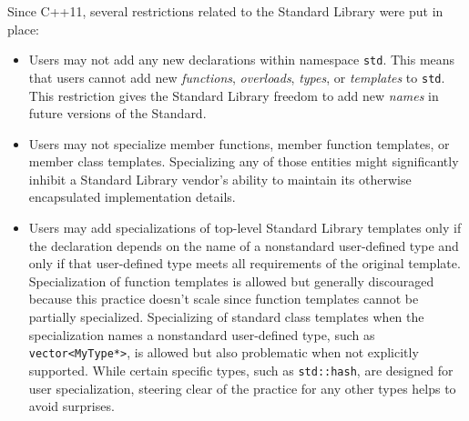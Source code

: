 Since C++11, several restrictions related to the Standard Library were
put in place:
\begin{itemize}
\item{Users may not add any new declarations within namespace \texttt{std}. This means that users cannot add new \textit{functions}, \textit{overloads}, \textit{types}, or \textit{templates} to \texttt{std}. This restriction gives the Standard Library freedom to add new \textit{names} in future versions of the Standard.}
\item{Users may not specialize member functions, member function templates, or member class templates. Specializing any of those entities might significantly inhibit a Standard Library vendor’s ability to maintain its otherwise encapsulated implementation details.}
\item{Users may add specializations of top-level Standard Library templates only if the declaration depends on the name of a nonstandard user-defined type and only if that user-defined type meets all requirements of the original template. Specialization of function templates is allowed but generally discouraged because this practice doesn’t scale since function templates cannot be partially specialized. Specializing of standard class templates when the specialization names a nonstandard user-defined type, such as \texttt{vector<MyType*>}, is allowed but also problematic when not explicitly supported. While certain specific types, such as \texttt{std::hash}, are designed for user specialization, steering clear of the practice for any other types helps to avoid surprises.}
\end{itemize}

